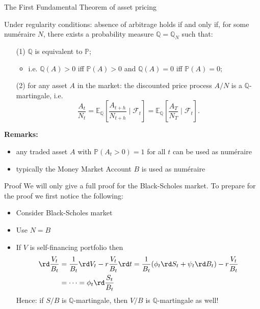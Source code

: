 \documentclass[pdf, handout]{beamer}
\renewcommand{\calF}{\mathcal{F}}
\begin{document}
%
\begin{frame}{The First Fundamental Theorem of asset pricing}
\begin{theorem} Under regularity conditions: 
absence of arbitrage holds if and only if,
for some num\'{e}raire $N$, there exists a probability measure $\mathbb{Q}=\mathbb{Q}_N$ such that:
\begin{itemize}
\item[(1)] $\mathbb{Q}$ is equivalent to $\mathbb{P}$;
\begin{itemize}
\item i.e. $\mathbb{Q}(A)>0$ iff $\mathbb{P}(A)>0$ and $\mathbb{Q}(A)=0$ iff $\mathbb{P}(A)=0$;
\end{itemize}
\item[(2)] for any asset $A$ in the market: the discounted price process $A/N$ is a $\mathbb{Q}$-martingale, i.e. 
\[
\frac{A_t}{N_t}=\mathbb{E}_{\mathbb{Q}}\left[ \frac{A_{t+h}}{N_{t+h}} \mid \calF_t \right] 
=
\mathbb{E}_{\mathbb{Q}}\left[ \frac{A_{T}}{N_{T}} \mid \calF_t \right].
\]
\end{itemize}
\end{theorem}
\textbf{Remarks:}
\begin{itemize}
\item any traded asset $A$ with $\mathbb{P}(A_t > 0)=1$ for all $t$ can be used as num\'{e}raire
\item typically the Money Market Account $B$ is used as num\'{e}raire 
\end{itemize}
%
\end{frame}
%
\begin{frame}{Proof}
We will only give a full proof for the Black-Scholes market. To prepare for the proof we first notice the following:
\begin{itemize}
\item Consider Black-Scholes market
\item Use $N=B$
\item If $V$ is self-financing portfolio then
\begin{align*}
\rd \frac{V_t}{B_t}
&= \frac{1}{B_t} \rd V_t - r \frac{V_t}{B_t} 
\rd t =
\frac{1}{B_t}(\phi_t \rd S_t + \psi_t \rd B_t)
 -r \frac{V_t}{B_t} \\
 & =\dots = \phi_t \rd \frac{S_t}{B_t}
\end{align*}
Hence: if $S/B$ is $\mathbb{Q}$-martingale, then
$V/B$ is $\mathbb{Q}$-martingale as well!
\end{itemize}
\end{frame}
\end{document}
